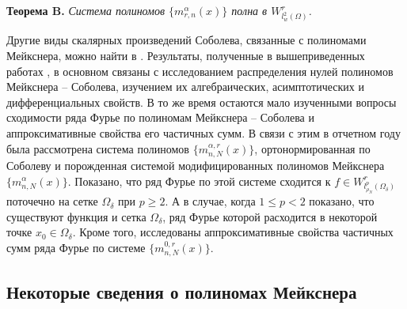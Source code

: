 \textbf{Теорема B.}
\textit{
Система полиномов $\{m_{r,n}^\alpha(x)\}$ полна в $W^r_{l_w^2(\Omega)}$.
}

Другие виды скалярных произведений Соболева, связанные с полиномами Мейкснера, можно найти в \cite{Ram-Mor-Bal,Ram-Co-So-Vil}.
Результаты, полученные в вышеприведенных работах \cite{Ram-Shar-VMJ,Ram-Ar-Go-Mar,Ram-Kh-Old,Ram-Bav1,Ram-Bav2,Ram-Shar-Sar,Ram-Mor-Bal,Ram-Co-So-Vil}, в основном связаны с исследованием распределения нулей полиномов Мейкснера --  Соболева, изучением их алгебраических, асимптотических и дифференциальных свойств. В то же время остаются мало изученными вопросы сходимости ряда Фурье по полиномам Мейкснера -- Соболева и аппроксимативные свойства его частичных сумм. В связи с этим в отчетном году была рассмотрена система полиномов $\{m_{n,N}^{\alpha,r}(x)\}$, ортонормированная по Соболеву и порожденная системой модифицированных полиномов Мейкснера $\{m_{n,N}^{\alpha}(x)\}$.
Показано, что ряд Фурье по этой системе сходится к $f\in W^r_{l^p_{\rho_N}(\Omega_\delta)}$ поточечно на сетке $\Omega_\delta$ при $p\ge2$. А в случае, когда $1\le p<2$ показано, что существуют функция и сетка $\Omega_\delta$, ряд Фурье которой расходится в некоторой точке $x_0\in\Omega_\delta$. Кроме того, исследованы аппроксимативные свойства частичных сумм ряда Фурье по системе $\{m_{n,N}^{0,r}(x)\}$.

\subsection{Некоторые сведения о полиномах Мейкснера}

